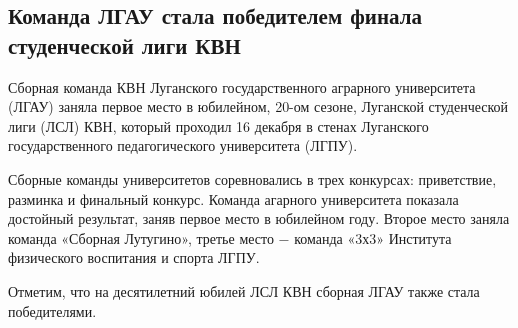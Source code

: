  
 
 
 
 
\subsection{Команда ЛГАУ стала победителем финала студенческой лиги КВН}
\label{sec:20_12_2021.stz.edu.lnr.lgau.1.kvn}



Сборная команда КВН Луганского государственного аграрного университета (ЛГАУ)
заняла первое место в юбилейном, 20-ом сезоне, Луганской студенческой лиги
(ЛСЛ) КВН, который проходил 16 декабря в стенах Луганского государственного
педагогического университета (ЛГПУ).

Сборные команды университетов соревновались в трех конкурсах: приветствие,
разминка и финальный конкурс. Команда агарного университета показала достойный
результат, заняв первое место в юбилейном году. Второе место заняла команда
«Сборная Лутугино», третье место − команда «3х3» Института физического
воспитания и спорта ЛГПУ.

Отметим, что на десятилетний юбилей ЛСЛ КВН сборная ЛГАУ также стала
победителями.
